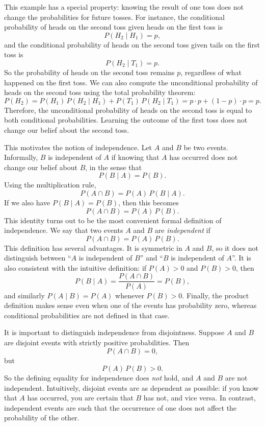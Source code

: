This example has a special property: knowing the result of one toss does not change the probabilities for future tosses. For instance, the conditional probability of heads on the second toss given heads on the first toss is
\[
P(H_2 \mid H_1) = p,
\]
and the conditional probability of heads on the second toss given tails on the first toss is
\[
P(H_2 \mid T_1) = p.
\]
So the probability of heads on the second toss remains \(p\), regardless of what happened on the first toss. We can also compute the unconditional probability of heads on the second toss using the total probability theorem:
\[
P(H_2) = P(H_1)\,P(H_2 \mid H_1) + P(T_1)\,P(H_2 \mid T_1)
= p \cdot p + (1-p)\cdot p = p.
\]
Therefore, the unconditional probability of heads on the second toss is equal to both conditional probabilities. Learning the outcome of the first toss does not change our belief about the second toss.

This motivates the notion of independence. Let \(A\) and \(B\) be two events. Informally, \(B\) is independent of \(A\) if knowing that \(A\) has occurred does not change our belief about \(B\), in the sense that
\[
P(B \mid A) = P(B).
\]
Using the multiplication rule,
\[
P(A \cap B) = P(A)\,P(B \mid A).
\]
If we also have \(P(B \mid A) = P(B)\), then this becomes
\[
P(A \cap B) = P(A)\,P(B).
\]
This identity turns out to be the most convenient formal definition of independence. We say that two events \(A\) and \(B\) are \textit{independent} if
\[
P(A \cap B) = P(A)\,P(B).
\]
This definition has several advantages. It is symmetric in \(A\) and \(B\), so it does not distinguish between “\(A\) is independent of \(B\)” and “\(B\) is independent of \(A\)”. It is also consistent with the intuitive definition: if \(P(A) > 0\) and \(P(B) > 0\), then
\[
P(B \mid A) = \frac{P(A \cap B)}{P(A)} = P(B),
\]
and similarly \(P(A \mid B) = P(A)\) whenever \(P(B) > 0\). Finally, the product definition makes sense even when one of the events has probability zero, whereas conditional probabilities are not defined in that case.

It is important to distinguish independence from disjointness. Suppose \(A\) and \(B\) are disjoint events with strictly positive probabilities. Then
\[
P(A \cap B) = 0,
\]
but
\[
P(A)\,P(B) > 0.
\]
So the defining equality for independence does \textit{not} hold, and \(A\) and \(B\) are not independent. Intuitively, disjoint events are as dependent as possible: if you know that \(A\) has occurred, you are certain that \(B\) has not, and vice versa. In contrast, independent events are such that the occurrence of one does not affect the probability of the other.

